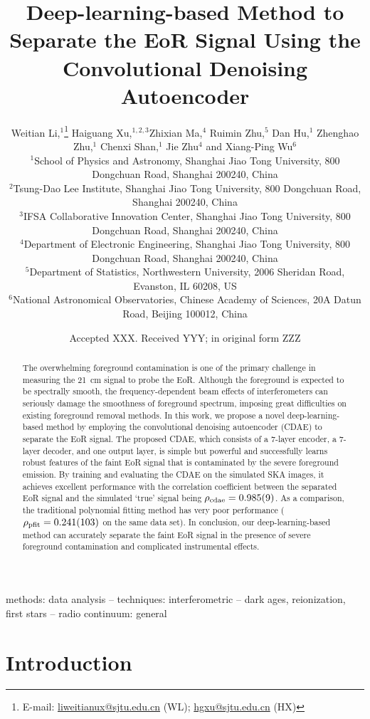\documentclass[letters,a4paper,fleqn,usenatbib]{mnras}
\title[EoR Separation with CDAE]{%
  Deep-learning-based Method to Separate the EoR Signal
  Using the Convolutional Denoising Autoencoder
}
\author[Li~et~al.]{%
Weitian Li,$^{1}$\thanks{E-mail:
  \href{mailto:liweitianux@sjtu.edu.cn}{liweitianux@sjtu.edu.cn} (WL);
  \href{mailto:hgxu@sjtu.edu.cn}{hgxu@sjtu.edu.cn} (HX)}
Haiguang Xu,$^{1,2,3}$\footnotemark[1]
Zhixian Ma,$^{4}$
Ruimin Zhu,$^{5}$
Dan Hu,$^{1}$
Zhenghao Zhu,$^{1}$
\newauthor
Chenxi Shan,$^{1}$
Jie Zhu$^{4}$
and
Xiang-Ping Wu$^{6}$
\\
$^{1}${School of Physics and Astronomy,
  Shanghai Jiao Tong University,
  800 Dongchuan Road, Shanghai 200240, China} \\
$^{2}${Tsung-Dao Lee Institute,
  Shanghai Jiao Tong University,
  800 Dongchuan Road, Shanghai 200240, China} \\
$^{3}${IFSA Collaborative Innovation Center,
  Shanghai Jiao Tong University,
  800 Dongchuan Road, Shanghai 200240, China} \\
$^{4}${Department of Electronic Engineering,
  Shanghai Jiao Tong University,
  800 Dongchuan Road, Shanghai 200240, China} \\
$^{5}${Department of Statistics,
  Northwestern University,
  2006 Sheridan Road, Evanston, IL 60208, US} \\
$^{6}${National Astronomical Observatories,
  Chinese Academy of Sciences,
  20A Datun Road, Beijing 100012, China}
}
\date{Accepted XXX. Received YYY; in original form ZZZ}
\newcommand{\R}[1]{\mathrm{#1}}
\begin{document}
\label{firstpage}
\pagerange{\pageref{firstpage}--\pageref{lastpage}}
\maketitle

%
%
\begin{abstract}
The overwhelming foreground contamination is one of the primary
challenge in measuring the \SI{21}{\cm} signal to probe the EoR.
Although the foreground is expected to be spectrally smooth,
the frequency-dependent beam effects of interferometers can
seriously damage the smoothness of foreground spectrum,
imposing great difficulties on existing foreground removal methods.
In this work, we propose a novel deep-learning-based method by employing
the convolutional denoising autoencoder (CDAE) to separate the EoR signal.
The proposed CDAE, which consists of a 7-layer encoder, a 7-layer
decoder, and one output layer, is simple but powerful and successfully
learns robust features of the faint EoR signal that is contaminated by the
severe foreground emission.
By training and evaluating the CDAE on the simulated SKA images, it
achieves excellent performance with the correlation coefficient between
the separated EoR signal and the simulated `true' signal being
$\rho_{\R{cdae}} = \num{0.985 +- 0.009}$.
As a comparison, the traditional polynomial fitting method has very poor
performance ($\rho_{\R{pfit}} = \num{0.241 +- 0.103}$ on the same data set).
In conclusion, our deep-learning-based method can accurately separate
the faint EoR signal in the presence of severe foreground contamination
and complicated instrumental effects.
\end{abstract}

\begin{keywords}
methods: data analysis --
techniques: interferometric --
dark ages, reionization, first stars --
radio continuum: general
\end{keywords}



\section{Introduction}
\label{sec:intro}
\end{document}
